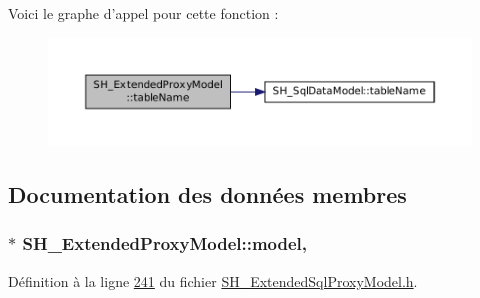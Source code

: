 Voici le graphe d'appel pour cette fonction \-:\nopagebreak
\begin{figure}[H]
\begin{center}
\leavevmode
\includegraphics[width=350pt]{classSH__ExtendedProxyModel_abb133e196ca7cf90b9c9b57263e898d6_cgraph}
\end{center}
\end{figure}




\subsection{Documentation des données membres}
\hypertarget{classSH__ExtendedProxyModel_a8c8b8930c6b1abd9bbb1dce1fdc9690b}{
\subsubsection[{model}]{$\ast$ S\-H\-\_\-\-Extended\-Proxy\-Model\-::model\hspace{0.3cm}{\ttfamily [protected]}, {\ttfamily [inherited]}}}\label{classSH__ExtendedProxyModel_a8c8b8930c6b1abd9bbb1dce1fdc9690b}


Définition à la ligne \hyperlink{SH__ExtendedSqlProxyModel_8h_source_l00241}{241} du fichier \hyperlink{SH__ExtendedSqlProxyModel_8h_source}{S\-H\-\_\-\-Extended\-Sql\-Proxy\-Model.\-h}.



